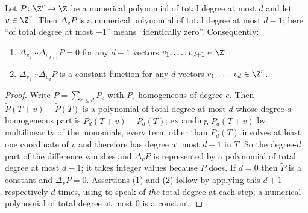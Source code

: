 \begin{lemma}
\label{lem:deg-difference-lowers-degree}
Let $P\colon\Z^r\to\Z$ be a numerical polynomial of total degree at most $d$
and let $v\in\Z^r$.  Then $\Delta_vP$ is a numerical polynomial of total degree
at most $d-1$; here ``of total degree at most $-1$'' means ``identically
zero''.  Consequently:
\begin{enumerate}
  \item $\Delta_{v_1}\cdots\Delta_{v_{d+1}}P=0$ for any $d+1$ vectors
  $v_1,\dots,v_{d+1}\in\Z^r$;
  \item $\Delta_{v_1}\cdots\Delta_{v_d}P$ is a constant function for any $d$
  vectors $v_1,\dots,v_d\in\Z^r$.
\end{enumerate}
\end{lemma}
\begin{proof}
Write $\widetilde P=\sum_{e\leq d}\widetilde P_e$ with $\widetilde P_e$
homogeneous of degree $e$.  Then
$\widetilde P(T+v)-\widetilde P(T)$ is a polynomial of total degree at most
$d$ whose degree-$d$ homogeneous part is
$\widetilde P_d(T+v)-\widetilde P_d(T)$; expanding
$\widetilde P_d(T+v)$ by multilinearity of the monomials, every term other
than $\widetilde P_d(T)$ involves at least one coordinate of $v$ and therefore
has degree at most $d-1$ in $T$.  So the degree-$d$ part of the difference
vanishes and $\Delta_vP$ is represented by a polynomial of total degree at
most $d-1$; it takes integer values because $P$ does.  If $d=0$ then
$\widetilde P$ is a constant and $\Delta_vP=0$.  Assertions (1) and (2) follow
by applying this $d+1$ respectively $d$ times, using
 to speak of \emph{the} total degree at each
step; a numerical polynomial of total degree at most $0$ is a constant.
\end{proof}

